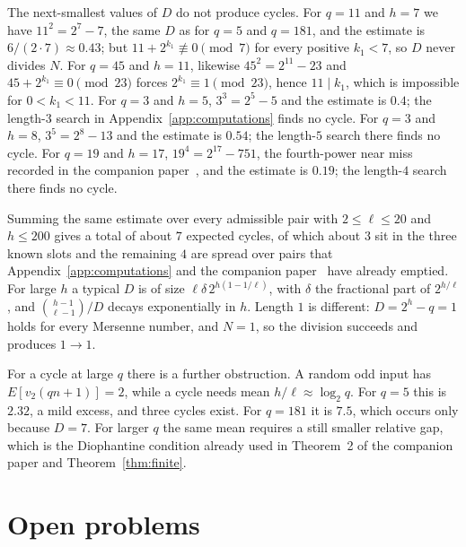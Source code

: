\documentclass[11pt]{article}
\begin{document}
The next-smallest values of $D$ do not produce cycles.
For $q = 11$ and $h = 7$ we have $11^2 = 2^7 - 7$, the same $D$ as for $q = 5$ and $q = 181$, and the estimate is $6/(2\cdot 7) \approx 0.43$; but $11 + 2^{k_1} \not\equiv 0 \pmod{7}$ for every positive $k_1 < 7$, so $D$ never divides $N$.
For $q = 45$ and $h = 11$, likewise $45^2 = 2^{11} - 23$ and $45 + 2^{k_1} \equiv 0 \pmod{23}$ forces $2^{k_1} \equiv 1 \pmod{23}$, hence $11 \mid k_1$, which is impossible for $0 < k_1 < 11$.
For $q = 3$ and $h = 5$, $3^3 = 2^5 - 5$ and the estimate is $0.4$; the length-$3$ search in Appendix~\ref{app:computations} finds no cycle.
For $q = 3$ and $h = 8$, $3^5 = 2^8 - 13$ and the estimate is $0.54$; the length-$5$ search there finds no cycle.
For $q = 19$ and $h = 17$, $19^4 = 2^{17} - 751$, the fourth-power near miss recorded in the companion paper~\cite{hackman-i}, and the estimate is $0.19$; the length-$4$ search there finds no cycle.

Summing the same estimate over every admissible pair with $2 \le \ell \le 20$ and $h \le 200$ gives a total of about $7$ expected cycles, of which about $3$ sit in the three known slots and the remaining $4$ are spread over pairs that Appendix~\ref{app:computations} and the companion paper~\cite{hackman-i} have already emptied.
For large $h$ a typical $D$ is of size $\ell \delta\, 2^{h(1-1/\ell)}$, with $\delta$ the fractional part of $2^{h/\ell}$, and $\binom{h-1}{\ell-1}/D$ decays exponentially in $h$.
Length $1$ is different: $D = 2^h - q = 1$ holds for every Mersenne number, and $N = 1$, so the division succeeds and produces $1 \to 1$.

For a cycle at large $q$ there is a further obstruction.
A random odd input has $E[v_2(qn+1)] = 2$, while a cycle needs mean $h/\ell \approx \log_2 q$.
For $q = 5$ this is $2.32$, a mild excess, and three cycles exist.
For $q = 181$ it is $7.5$, which occurs only because $D = 7$.
For larger $q$ the same mean requires a still smaller relative gap, which is the Diophantine condition already used in Theorem~2 of the companion paper and Theorem~\ref{thm:finite}.

\section{Open problems}
\label{sec:open}
\end{document}
